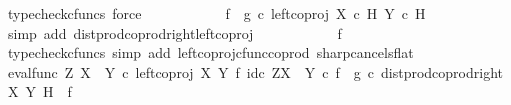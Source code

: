 \begin{isabellebody}
\ {\isacharparenleft}{\kern0pt}typecheck{\isacharunderscore}{\kern0pt}cfuncs{\isacharcomma}{\kern0pt}\ force{\isacharparenright}{\kern0pt}\isanewline
\ \ \ \ \ \ \isamarkupfalse%
\ \isamarkupfalse%
\ {\isachardoublequoteopen}{\isachardot}{\kern0pt}{\isachardot}{\kern0pt}{\isachardot}{\kern0pt}\ {\isacharequal}{\kern0pt}\ {\isacharparenleft}{\kern0pt}f\isactrlsup {\isasymflat}\ {\isasymamalg}\ g\isactrlsup {\isasymflat}\ {\isasymcirc}\isactrlsub c\ left{\isacharunderscore}{\kern0pt}coproj\ {\isacharparenleft}{\kern0pt}X\ {\isasymtimes}\isactrlsub c\ H{\isacharparenright}{\kern0pt}\ {\isacharparenleft}{\kern0pt}Y\ {\isasymtimes}\isactrlsub c\ H{\isacharparenright}{\kern0pt}{\isacharparenright}{\kern0pt}\isactrlsup {\isasymsharp}{\isachardoublequoteclose}\isanewline
\ \ \ \ \ \ \ \ \isamarkupfalse%
\ {\isacharparenleft}{\kern0pt}simp\ add{\isacharcolon}{\kern0pt}\ dist{\isacharunderscore}{\kern0pt}prod{\isacharunderscore}{\kern0pt}coprod{\isacharunderscore}{\kern0pt}right{\isacharunderscore}{\kern0pt}left{\isacharunderscore}{\kern0pt}coproj{\isacharparenright}{\kern0pt}\isanewline
\ \ \ \ \ \ \isamarkupfalse%
\ \isamarkupfalse%
\ {\isachardoublequoteopen}{\isachardot}{\kern0pt}{\isachardot}{\kern0pt}{\isachardot}{\kern0pt}\ {\isacharequal}{\kern0pt}\ f{\isachardoublequoteclose}\isanewline
\ \ \ \ \ \ \ \ \isamarkupfalse%
\ {\isacharparenleft}{\kern0pt}typecheck{\isacharunderscore}{\kern0pt}cfuncs{\isacharcomma}{\kern0pt}\ simp\ add{\isacharcolon}{\kern0pt}\ left{\isacharunderscore}{\kern0pt}coproj{\isacharunderscore}{\kern0pt}cfunc{\isacharunderscore}{\kern0pt}coprod\ sharp{\isacharunderscore}{\kern0pt}cancels{\isacharunderscore}{\kern0pt}flat{\isacharparenright}{\kern0pt}\isanewline
\ \ \ \ \ \ \isamarkupfalse%
\ \isamarkupfalse%
\ {\isachardoublequoteopen}{\isacharparenleft}{\kern0pt}eval{\isacharunderscore}{\kern0pt}func\ Z\ {\isacharparenleft}{\kern0pt}X\ {\isasymCoprod}\ Y{\isacharparenright}{\kern0pt}\ {\isasymcirc}\isactrlsub c\ left{\isacharunderscore}{\kern0pt}coproj\ X\ Y\ {\isasymtimes}\isactrlsub f\ id\isactrlsub c\ {\isacharparenleft}{\kern0pt}Z\isactrlbsup {\isacharparenleft}{\kern0pt}X\ {\isasymCoprod}\ Y{\isacharparenright}{\kern0pt}\isactrlesup {\isacharparenright}{\kern0pt}{\isacharparenright}{\kern0pt}\isactrlsup {\isasymsharp}\ {\isasymcirc}\isactrlsub c\ {\isacharparenleft}{\kern0pt}f\isactrlsup {\isasymflat}\ {\isasymamalg}\ g\isactrlsup {\isasymflat}\ {\isasymcirc}\isactrlsub c\ dist{\isacharunderscore}{\kern0pt}prod{\isacharunderscore}{\kern0pt}coprod{\isacharunderscore}{\kern0pt}right\ X\ Y\ H{\isacharparenright}{\kern0pt}\isactrlsup {\isasymsharp}\ {\isacharequal}{\kern0pt}\ f{\isachardoublequoteclose}\isanewline

\end{isabellebody}

